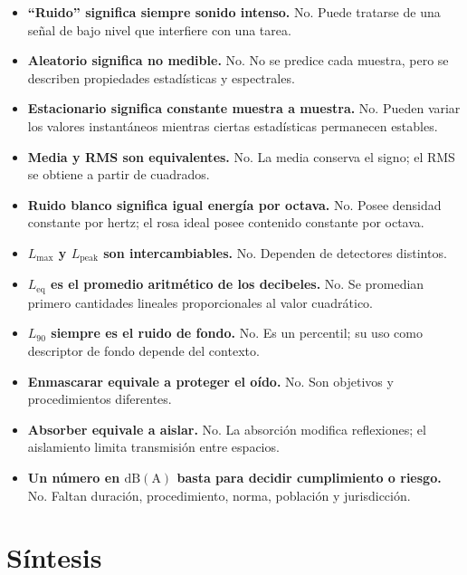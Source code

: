 \begin{itemize}
    \item \textbf{``Ruido'' significa siempre sonido intenso.} No. Puede
    tratarse de una señal de bajo nivel que interfiere con una tarea.
    \item \textbf{Aleatorio significa no medible.} No. No se predice cada
    muestra, pero se describen propiedades estadísticas y espectrales.
    \item \textbf{Estacionario significa constante muestra a muestra.} No.
    Pueden variar los valores instantáneos mientras ciertas estadísticas
    permanecen estables.
    \item \textbf{Media y RMS son equivalentes.} No. La media conserva el
    signo; el RMS se obtiene a partir de cuadrados.
    \item \textbf{Ruido blanco significa igual energía por octava.} No. Posee
    densidad constante por hertz; el rosa ideal posee contenido constante por
    octava.
    \item \textbf{\(L_{\mathrm{max}}\) y \(L_{\mathrm{peak}}\) son
    intercambiables.} No. Dependen de detectores distintos.
    \item \textbf{\(L_{\mathrm{eq}}\) es el promedio aritmético de los
    decibeles.} No. Se promedian primero cantidades lineales proporcionales al
    valor cuadrático.
    \item \textbf{\(L_{90}\) siempre es el ruido de fondo.} No. Es un
    percentil; su uso como descriptor de fondo depende del contexto.
    \item \textbf{Enmascarar equivale a proteger el oído.} No. Son objetivos y
    procedimientos diferentes.
    \item \textbf{Absorber equivale a aislar.} No. La absorción modifica
    reflexiones; el aislamiento limita transmisión entre espacios.
    \item \textbf{Un número en \(\mathrm{dB(A)}\) basta para decidir
    cumplimiento o riesgo.} No. Faltan duración, procedimiento, norma,
    población y jurisdicción.
\end{itemize}

\section{Síntesis}
\label{sec:u10-sintesis}

